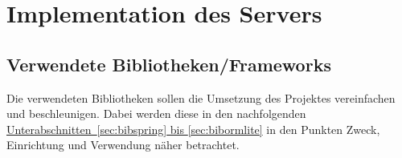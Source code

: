 
\chapter{Implementation des Servers}
\section{Verwendete Bibliotheken/Frameworks}
Die verwendeten Bibliotheken sollen die Umsetzung des Projektes vereinfachen und beschleunigen. Dabei werden diese in den nachfolgenden \hyperref[sec:bibspring, sec:bibormlite]{Unterabschnitten~\ref{sec:bibspring} bis \ref{sec:bibormlite}} in den Punkten Zweck, Einrichtung und Verwendung näher betrachtet. 

